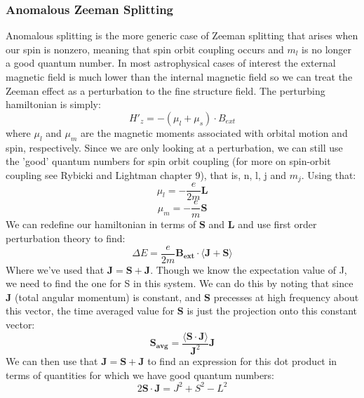 \documentclass{article}
\begin{document}
 \subsubsection{Anomalous Zeeman Splitting }
Anomalous splitting is the more generic case of Zeeman splitting that arises when our spin is nonzero, meaning that spin orbit coupling occurs and $m_l$ is no longer a good quantum number. In most astrophysical cases of interest the external magnetic field is much lower than the internal magnetic field so we can treat the Zeeman effect as a perturbation to the fine structure field. The perturbing hamiltonian is simply:
\begin{equation}
H'_z = -(\mu_l +\mu_s) \cdot B_{ext}
\end{equation} 
where $\mu_l$ and $\mu_m$ are the magnetic moments associated with orbital motion and spin, respectively. Since we are only looking at a perturbation, we can still use the 'good' quantum numbers for spin orbit coupling (for more on spin-orbit coupling see Rybicki and Lightman chapter 9), that is, n, l, j and $m_j$. Using that:
\begin{equation}
\mu_l = -\frac{e}{2m}\mathbf{L}
\end{equation}
\begin{equation}
\mu_m = -\frac{e}{m}{\mathbf{S}}
\end{equation}
We can redefine our hamiltonian in terms of $\mathbf{S}$ and $\mathbf{L}$ and use first order perturbation theory to find:
\begin{equation}
\Delta E = \frac{e}{2m} \mathbf{B_{ext}} \cdot  \big \langle \mathbf{J} + \mathbf{S} \big \rangle 
\end{equation}
Where we've used that ${\mathbf{J}} = {\mathbf{S}}+{\mathbf{J}}$. Though we know the expectation value of J, we need to find the one for S in this system. We can do this by noting that since $\mathbf{J}$ (total angular momentum) is constant, and $\mathbf{S}$ precesses at high frequency about this vector, the time averaged value for $\mathbf{S}$ is just the projection onto this constant vector:
\begin{equation}
\mathbf{S_{avg}} = \frac{ \big \langle \mathbf{S} \cdot \mathbf{J}\big \rangle}  {\mathbf{J}^2} \mathbf{J}
\end{equation}
We can then use that $\mathbf{J} = \mathbf{S}+\mathbf{J}$ to find an expression for this dot product in terms of quantities for which we have good quantum numbers: 
\begin{equation}
2\mathbf{S} \cdot \mathbf{J} = J^2 + S^2 -L^2 
\end{equation}
\end{document}

